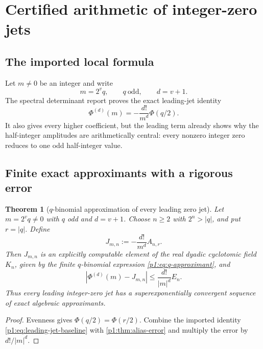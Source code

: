 \documentclass[11pt,oneside]{article}
\newtheorem{theorem}{Theorem}[section]
\theoremstyle{definition}
\theoremstyle{remark}
\newcommand{\PhiU}{\Phi}
\begin{document}
\section{Certified arithmetic of integer-zero jets}\label{p1:sec:zero-jets}

\subsection{The imported local formula}

Let $m\ne0$ be an integer and write
\begin{equation}\label{p1:eq:m-v-q}
 m=2^vq,
 \qquad q\ \text{odd},
 \qquad d=v+1.
\end{equation}
The spectral determinant report proves the exact leading-jet identity
\begin{equation}\label{p1:eq:leading-jet-baseline}
 \PhiU^{(d)}(m)=-\frac{d!}{m^d}\PhiU(q/2).
\end{equation}
It also gives every higher coefficient, but the leading term already shows why
the half-integer amplitudes are arithmetically central: every nonzero integer
zero reduces to one odd half-integer value.

\subsection{Finite exact approximants with a rigorous error}

\begin{theorem}[$q$-binomial approximation of every leading zero jet]\label{p1:thm:jet-approximant}
Let $m=2^vq\ne0$ with $q$ odd and $d=v+1$.  Choose $n\ge2$ with
$2^n>|q|$, and put $r=|q|$.  Define
\begin{equation}\label{p1:eq:J-m-n}
 J_{m,n}:=-\frac{d!}{m^d}A_{n,r}.
\end{equation}
Then $J_{m,n}$ is an explicitly computable element of the real dyadic
cyclotomic field $K_n$, given by the finite $q$-binomial expression
\eqref{p1:eq:q-approximant}, and
\begin{equation}\label{p1:eq:jet-error}
 \boxed{
 |\PhiU^{(d)}(m)-J_{m,n}|
 \le\frac{d!}{|m|^d}E_n.}
\end{equation}
Thus every leading integer-zero jet has a superexponentially convergent sequence
of exact algebraic approximants.
\end{theorem}

\begin{proof}
Evenness gives $\PhiU(q/2)=\PhiU(r/2)$.  Combine the imported identity
\eqref{p1:eq:leading-jet-baseline} with \cref{p1:thm:alias-error} and multiply the
error by $d!/|m|^d$.
\end{proof}
\end{document}
